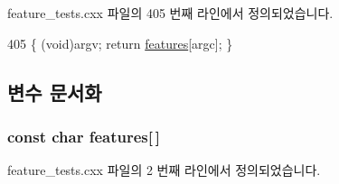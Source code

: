 feature\+\_\+tests.\+cxx 파일의 405 번째 라인에서 정의되었습니다.


\begin{DoxyCode}
405 \{ (void)argv; \textcolor{keywordflow}{return} \hyperlink{avdecc-lib_2_c_make_files_2feature__tests_8cxx_a1582568e32f689337602a16bf8a5bff0}{features}[argc]; \}
\end{DoxyCode}


\subsection{변수 문서화}
\subsubsection[{\texorpdfstring{features}{features}}]{\setlength{\rightskip}{0pt plus 5cm}const char features\mbox{[}$\,$\mbox{]}}\hypertarget{avdecc-lib_2jdksavdecc-c_2_c_make_files_2feature__tests_8cxx_a1582568e32f689337602a16bf8a5bff0}{}\label{avdecc-lib_2jdksavdecc-c_2_c_make_files_2feature__tests_8cxx_a1582568e32f689337602a16bf8a5bff0}


feature\+\_\+tests.\+cxx 파일의 2 번째 라인에서 정의되었습니다.


